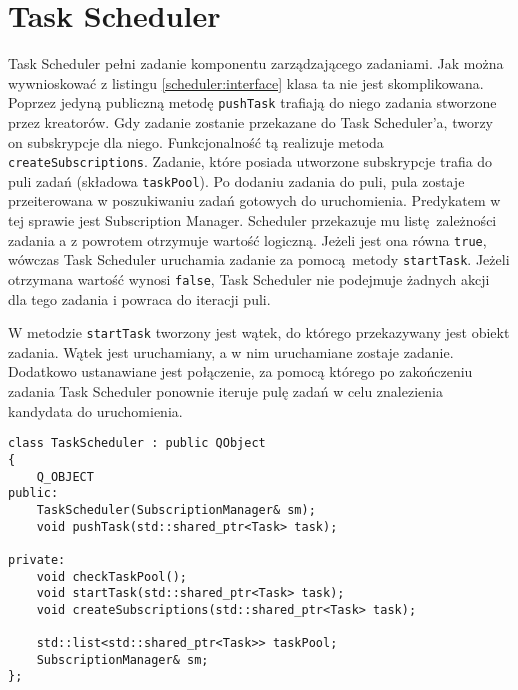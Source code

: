 \section{Task Scheduler} 
Task Scheduler pełni zadanie komponentu zarządzającego zadaniami. Jak można wywnioskować z listingu \ref{scheduler:interface} klasa ta nie jest skomplikowana. Poprzez jedyną publiczną metodę \lstinline$pushTask$ trafiają do niego zadania stworzone przez kreatorów. Gdy zadanie zostanie przekazane do Task Scheduler'a, tworzy on subskrypcje dla niego. Funkcjonalność tą realizuje metoda \lstinline$createSubscriptions$. Zadanie, które posiada utworzone subskrypcje trafia do puli zadań (składowa \lstinline$taskPool$). Po dodaniu zadania do puli, pula zostaje przeiterowana w poszukiwaniu zadań gotowych do uruchomienia. Predykatem w tej sprawie jest Subscription Manager. Scheduler przekazuje mu listę zależności zadania a z powrotem otrzymuje wartość logiczną. Jeżeli jest ona równa \lstinline$true$, wówczas Task Scheduler uruchamia zadanie za pomocą metody \lstinline$startTask$. Jeżeli otrzymana wartość wynosi \lstinline$false$, Task Scheduler nie podejmuje żadnych akcji dla tego zadania i powraca do iteracji puli.

W metodzie \lstinline$startTask$ tworzony jest wątek, do którego przekazywany jest obiekt zadania. Wątek jest uruchamiany, a w nim uruchamiane zostaje zadanie. Dodatkowo ustanawiane jest połączenie, za pomocą którego po zakończeniu zadania Task Scheduler ponownie iteruje pulę zadań w celu znalezienia kandydata do uruchomienia. 

\begin{minipage}{\textwidth}
	\begin{lstlisting}[label=scheduler:interface, caption={Deklaracja klasy \lstinline$TaskScheduler$},alsoletter={()[].=}]
class TaskScheduler : public QObject
{
	Q_OBJECT
public:
	TaskScheduler(SubscriptionManager& sm);
	void pushTask(std::shared_ptr<Task> task);

private:
	void checkTaskPool();
	void startTask(std::shared_ptr<Task> task);
	void createSubscriptions(std::shared_ptr<Task> task);

	std::list<std::shared_ptr<Task>> taskPool;
	SubscriptionManager& sm;
};
	\end{lstlisting}
\end{minipage}
